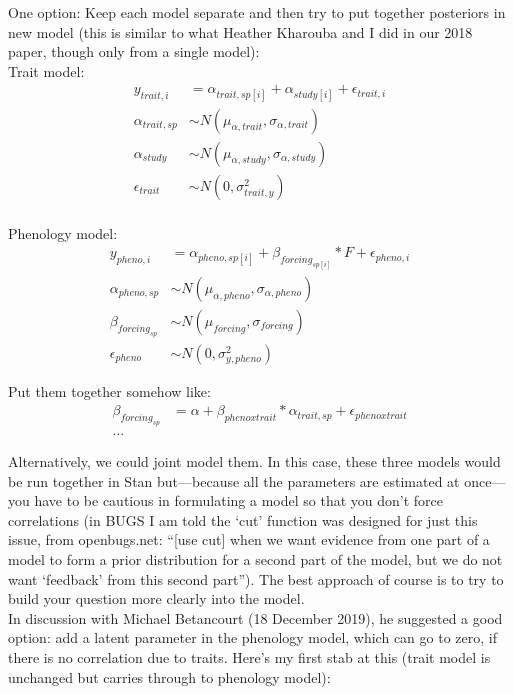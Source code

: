 \documentclass[11pt,letter]{article}
\begin{document}
One option: Keep each model separate and then try to put together posteriors in new model (this is similar to what Heather Kharouba and I did in our 2018 paper, though only from a single model):\\

Trait model:
\begin{align*}
y_{trait, i} &= \alpha_{trait, sp[i]} + \alpha_{study[i]} + \epsilon_{trait, i}\\
\alpha_{trait, sp} & \sim N(\mu_{\alpha, trait}, \sigma_{\alpha, trait}) \\
\alpha_{study}  & \sim N(\mu_{\alpha, study}, \sigma_{\alpha, study})\\
\epsilon_{trait} & \sim N(0,\sigma^2_{trait, y}) \\
\end{align*}

Phenology model:
\begin{align*}
y_{pheno, i} &= \alpha_{pheno, sp[i]} + \beta_{forcing_{sp[i]}}*F+ \epsilon_{pheno, i}\\
\alpha_{pheno, sp} & \sim N(\mu_{\alpha, pheno}, \sigma_{\alpha, pheno}) \\
\beta_{forcing_{sp}} & \sim N(\mu_{forcing}, \sigma_{forcing})\\
\epsilon_{pheno} & \sim N(0,\sigma^2_{y, pheno}) 
\end{align*}

Put them together somehow like:
\begin{align*}
\beta_{forcing_{sp}} &= \alpha + \beta_{pheno x trait}*\alpha_{trait, sp} + \epsilon_{pheno x trait}\\
...
\end{align*}

Alternatively, we could joint model them. In this case, these three models would be run together in Stan but---because all the parameters are estimated at once---you have to be cautious in formulating a model so that you don't force correlations (in BUGS I am told the `cut' function was designed for just this issue, from openbugs.net: ``[use cut] when we want evidence from one part of a model to form a prior distribution for a second part of the model, but we do not want `feedback' from this second part''). The best approach of course is to try to build your question more clearly into the model. \\

In discussion with Michael Betancourt (18 December 2019), he suggested a good option: add a latent parameter in the phenology model, which can go to zero, if there is no correlation due to traits. Here's my first stab at this (trait model is unchanged but carries through to phenology model):
\end{document}
